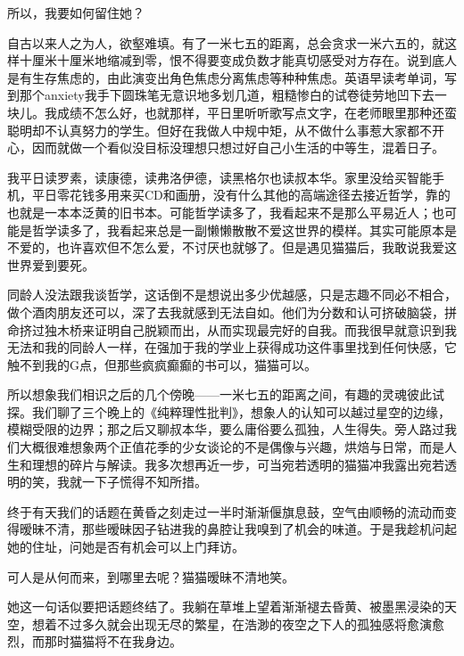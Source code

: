 \documentclass{article}
\begin{document}
所以，我要如何留住她？



自古以来人之为人，欲壑难填。有了一米七五的距离，总会贪求一米六五的，就这样十厘米十厘米地缩减到零，恨不得要变成负数才能真切感受对方存在。说到底人是有生存焦虑的，由此演变出角色焦虑分离焦虑等种种焦虑。英语早读考单词，写到那个anxiety我手下圆珠笔无意识地多划几道，粗糙惨白的试卷徒劳地凹下去一块儿。我成绩不怎么好，也就那样，平日里听听歌写点文字，在老师眼里那种还蛮聪明却不认真努力的学生。但好在我做人中规中矩，从不做什么事惹大家都不开心，因而就做一个看似没目标没理想只想过好自己小生活的中等生，混着日子。



我平日读罗素，读康德，读弗洛伊德，读黑格尔也读叔本华。家里没给买智能手机，平日零花钱多用来买CD和画册，没有什么其他的高端途径去接近哲学，靠的也就是一本本泛黄的旧书本。可能哲学读多了，我看起来不是那么平易近人；也可能是哲学读多了，我看起来总是一副懒懒散散不爱这世界的模样。其实可能原本是不爱的，也许喜欢但不怎么爱，不讨厌也就够了。但是遇见猫猫后，我敢说我爱这世界爱到要死。



同龄人没法跟我谈哲学，这话倒不是想说出多少优越感，只是志趣不同必不相合，做个酒肉朋友还可以，深了去我就感到无法自如。他们为分数和认可挤破脑袋，拼命挤过独木桥来证明自己脱颖而出，从而实现最完好的自我。而我很早就意识到我无法和我的同龄人一样，在强加于我的学业上获得成功这件事里找到任何快感，它触不到我的G点，但那些疯疯癫癫的书可以，猫猫可以。



所以想象我们相识之后的几个傍晚——一米七五的距离之间，有趣的灵魂彼此试探。我们聊了三个晚上的《纯粹理性批判》，想象人的认知可以越过星空的边缘，模糊受限的边界；那之后又聊叔本华，要么庸俗要么孤独，人生得失。旁人路过我们大概很难想象两个正值花季的少女谈论的不是偶像与兴趣，烘焙与日常，而是人生和理想的碎片与解读。我多次想再近一步，可当宛若透明的猫猫冲我露出宛若透明的笑，我就一下子慌得不知所措。



终于有天我们的话题在黄昏之刻走过一半时渐渐偃旗息鼓，空气由顺畅的流动而变得暧昧不清，那些暧昧因子钻进我的鼻腔让我嗅到了机会的味道。于是我趁机问起她的住址，问她是否有机会可以上门拜访。



可人是从何而来，到哪里去呢？猫猫暧昧不清地笑。



她这一句话似要把话题终结了。我躺在草堆上望着渐渐褪去昏黄、被墨黑浸染的天空，想着不过多久就会出现无尽的繁星，在浩渺的夜空之下人的孤独感将愈演愈烈，而那时猫猫将不在我身边。
\end{document}
